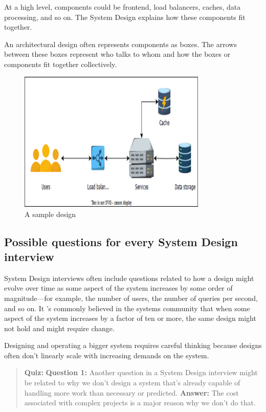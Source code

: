 At a high level, components could be frontend, load balancers, caches, data processing, and so on. The System Design explains how these components fit together.

An architectural design often represents components as boxes. The arrows between these boxes represent who talks to whom and how the boxes or components fit together collectively.

\begin{figure}[htbp]
 \centering
 \includegraphics[width=0.8\textwidth]{Images/chapter_1/section_4771234193080320/6196252415229952.png}
 \caption{A sample design}
\end{figure}

\subsection{Possible questions for every System Design interview}\label{N0oqEUUvDaJbCsC9k12Oe}

System Design interviews often include questions related to how a design might evolve over time as some aspect of the system increases by some order of magnitude---for example, the number of users, the number of queries per second, and so on. It 's commonly believed in the systems community that when some aspect of the system increases by a factor of ten or more, the same design might not hold and might require change.

Designing and operating a bigger system requires careful thinking because designs often don't linearly scale with increasing demands on the system.

\begin{quote}
\textbf{Quiz:}
\textbf{Question 1:} Another question in a System Design interview might be related to why we don't design a system that's already capable of handling more work than necessary or predicted.
\textbf{Answer:} The cost associated with complex projects is a major reason why we don't do that.
\end{quote}

